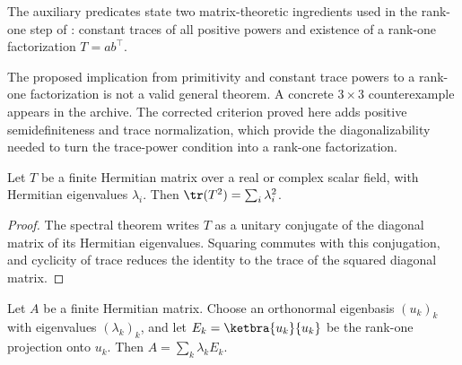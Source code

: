 \begin{definition}
    \label{def:matrix_trace_rankone_predicates}
    \leanok
    The auxiliary predicates state two matrix-theoretic ingredients used in
    the rank-one step of \cite[Appendix~C.2, Lemma~C.5]{Cirac2016MPDO_arXiv}:
    constant traces of all positive powers and existence of a rank-one
    factorization $T=ab^\top$.

    The proposed implication from primitivity and constant trace powers to a
    rank-one factorization is not a valid general theorem. A
    concrete $3\times 3$ counterexample appears in the archive. The corrected
    criterion proved here adds positive semidefiniteness and trace
    normalization, which provide the diagonalizability needed to turn the
    trace-power condition into a rank-one factorization.
\end{definition}

\begin{lemma}
    \label{thm:matrix_hermitian_trace_square_eigenvalues}
    \leanok
    Let $T$ be a finite Hermitian matrix over a real or complex scalar field,
    with Hermitian eigenvalues $\lambda_i$. Then
    $\tr(T^2)=\sum_i\lambda_i^2$.
\end{lemma}

\begin{proof}
    \leanok
    The spectral theorem writes $T$ as a unitary conjugate of the diagonal
    matrix of its Hermitian eigenvalues. Squaring commutes with this conjugation,
    and cyclicity of trace reduces the identity to the trace of the squared
    diagonal matrix.
\end{proof}

\begin{lemma}
    \label{thm:matrix_hermitian_rank_one_eigenvector_resolution}
    \leanok
    Let $A$ be a finite Hermitian matrix. Choose an orthonormal eigenbasis
    $(u_k)_k$ with eigenvalues $(\lambda_k)_k$, and let
    $E_k=\ketbra{u_k}{u_k}$ be the rank-one projection onto $u_k$. Then
    $A=\sum_k\lambda_kE_k$.
\end{lemma}

